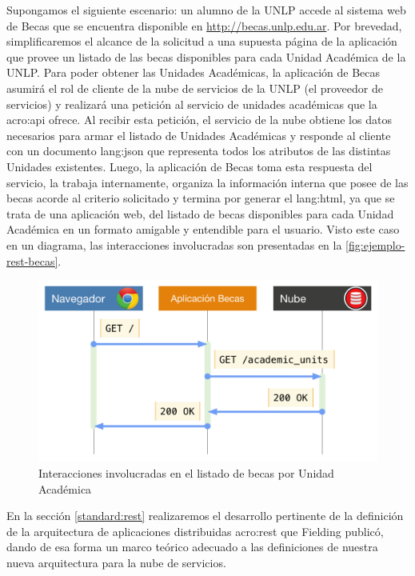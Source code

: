 Supongamos el siguiente escenario: un alumno de la UNLP accede al sistema web de Becas que se encuentra disponible en \url{http://becas.unlp.edu.ar}. Por brevedad, simplificaremos el alcance de la solicitud a una supuesta página de la aplicación que provee un listado de las becas disponibles para cada Unidad Académica de la UNLP. Para poder obtener las Unidades Académicas, la aplicación de Becas asumirá el rol de cliente de la nube de servicios de la UNLP (el proveedor de servicios) y realizará una petición al servicio de unidades académicas que la \gls{acro:api} ofrece. Al recibir esta petición, el servicio de la nube obtiene los datos necesarios para armar el listado de Unidades Académicas y responde al cliente con un documento \gls{lang:json} que representa todos los atributos de las distintas Unidades existentes. Luego, la aplicación de Becas toma esta respuesta del servicio, la trabaja internamente, organiza la información interna que posee de las becas acorde al criterio solicitado y termina por generar el \gls{lang:html}, ya que se trata de una aplicación web, del listado de becas disponibles para cada Unidad Académica en un formato amigable y entendible para el usuario. Visto este caso en un diagrama, las interacciones involucradas son presentadas en la \autoref{fig:ejemplo-rest-becas}.

\begin{figure}
  \includegraphics[width=\linewidth]{src/images/01-capitulo-1/ejemplo-rest-becas.png}
  \caption{Interacciones involucradas en el listado de becas por Unidad Académica}
  \label{fig:ejemplo-rest-becas}
\end{figure}

En la sección \ref{standard:rest} realizaremos el desarrollo pertinente de la definición de la arquitectura de aplicaciones distribuidas \gls{acro:rest} que Fielding publicó, dando de esa forma un marco teórico adecuado a las definiciones de nuestra nueva arquitectura para la nube de servicios.



